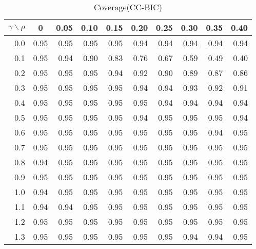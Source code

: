 \documentclass[12pt]{article}
\begin{document}
%
\begin{table}[!tbp]
\caption{Coverage(CC-BIC)}
 \begin{center}
 \begin{tabular}{r|rrrrrrrrr}\hline\hline
\multicolumn{1}{c|}{$\gamma\backslash\rho$}&\multicolumn{1}{c}{0}&\multicolumn{1}{c}{0.05}&\multicolumn{1}{c}{0.10}&\multicolumn{1}{c}{0.15}&\multicolumn{1}{c}{0.20}&\multicolumn{1}{c}{0.25}&\multicolumn{1}{c}{0.30}&\multicolumn{1}{c}{0.35}&\multicolumn{1}{c}{0.40}\tabularnewline
\hline

0.0&0.95&0.95&0.95&0.95&0.94&0.94&0.94&0.94&0.94\tabularnewline
0.1&0.95&0.94&0.90&0.83&0.76&0.67&0.59&0.49&0.40\tabularnewline
0.2&0.95&0.95&0.95&0.94&0.92&0.90&0.89&0.87&0.86\tabularnewline
0.3&0.95&0.95&0.95&0.95&0.94&0.94&0.93&0.92&0.91\tabularnewline
0.4&0.95&0.95&0.95&0.95&0.95&0.94&0.94&0.94&0.94\tabularnewline
0.5&0.95&0.95&0.95&0.95&0.94&0.95&0.95&0.95&0.94\tabularnewline
0.6&0.95&0.95&0.95&0.95&0.95&0.95&0.95&0.94&0.95\tabularnewline
0.7&0.95&0.95&0.95&0.95&0.95&0.95&0.95&0.95&0.95\tabularnewline
0.8&0.94&0.95&0.95&0.95&0.95&0.95&0.95&0.95&0.95\tabularnewline
0.9&0.95&0.95&0.95&0.95&0.95&0.95&0.95&0.95&0.95\tabularnewline
1.0&0.94&0.95&0.95&0.95&0.95&0.95&0.95&0.95&0.95\tabularnewline
1.1&0.94&0.94&0.95&0.95&0.95&0.95&0.95&0.95&0.95\tabularnewline
1.2&0.95&0.95&0.95&0.95&0.95&0.95&0.95&0.95&0.95\tabularnewline
1.3&0.95&0.95&0.95&0.95&0.95&0.95&0.94&0.94&0.95\tabularnewline
\hline
\end{tabular}

\end{center}

\end{table}
\end{document}
